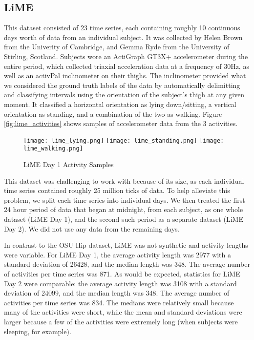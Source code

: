 \subsection{LiME}
This dataset consisted of 23 time series, each containing roughly 10 continuous
days worth of data from an individual subject. It was collected by Helen Brown from
the Univerity of Cambridge, and Gemma Ryde from the University of Stirling, Scotland.
Subjects wore an ActiGraph GT3X+
accelerometer during the entire period, which collected triaxial acceleration data at a frequency
of 30Hz, as well as an activPal inclinometer on their thighs. The inclinometer
provided what we considered the ground truth labels of the data by automatically
delimitting and classifying intervals using the orientation of the subject's thigh at any given moment. It 
classified a horizontal orientation as lying down/sitting,
a vertical orientation as standing, and a combination of the two as walking. Figure
\ref{fig:lime_activities} shows samples of accelerometer data from the 3 activities.

\begin{figure}
 \centering
 \texttt{[image: lime\_lying.png]}
 \texttt{[image: lime\_standing.png]}
 \texttt{[image: lime\_walking.png]}
 \caption{LiME Day 1 Activity Samples}
 \label{fig:uq_activities}
\end{figure}

This dataset was challenging to work with because of its size, as each individual time series
contained roughly 25 million ticks of data. To help alleviate this problem, we split each
time series into individual days. We then treated the first 24 hour period of data that began at midnight,
from each subject, as one whole dataset (LiME Day 1), and the second such period as a separate dataset
(LiME Day 2). We did not use any data from the remaining days.

In contrast to the OSU Hip dataset, LiME
was not synthetic and activity lengths were variable. For LiME Day 1, the
average activity length was 2977 with a standard deviation of 26428, and the
median length was 348. The average number of activities per time series was
871. As would be expected, statistics for LiME Day 2 were comparable: the
average activity length was 3108 with a standard deviation of 24099, and the
median length was 348. The average number of activities per time series was 834.
The medians were relatively small because many of the activities were short,
while the mean and standard deviations were larger because a few of the
activities were extremely long (when subjects were sleeping, for example).

